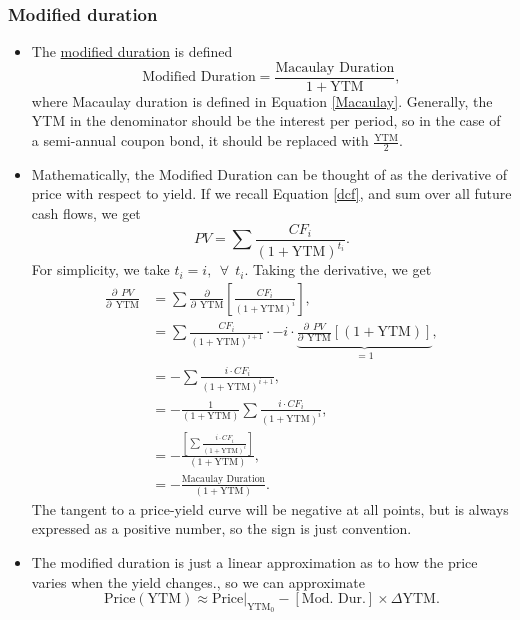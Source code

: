 \documentclass[../notes_compiled.tex]{subfiles}
\begin{document}
\subsubsection{Modified duration}
\begin{itemize}
\item The \underline{modified duration} is defined
\begin{equation}
\text{Modified Duration} = \frac{\text{Macaulay Duration}}{1 + \text{YTM}}, \label{mod-dur}
\end{equation}
where Macaulay duration is defined in Equation \ref{Macaulay}. Generally, the YTM in the denominator should be the interest per period, so in the case of a semi-annual coupon bond, it should be replaced with $\frac{\text{YTM}}{2}$.
\item Mathematically, the Modified Duration can be thought of as the derivative of price with respect to yield. If we recall Equation \ref{dcf}, and sum over all future cash flows, we get
\begin{equation}
PV = \sum\frac{CF_{i}}{(1+\text{YTM})^{t_{i}}}.
\end{equation}
For simplicity, we take $t_i = i, \phantom{,}\forall\phantom{,} t_{i}$. Taking the derivative, we get
\begin{align}
\frac{\partial \phantom{,}PV}{\partial \phantom{,}\text{YTM}} &= \sum\frac{\partial}{\partial \phantom{,}\text{YTM}}\left[\frac{CF_{i}}{(1+\text{YTM})^{i}}\right], \label{deriv-dur}\\
&= \sum\frac{CF_{i}}{(1+\text{YTM})^{i+1}}\cdot-i\cdot\underbrace{\frac{\partial \phantom{,}PV}{\partial \phantom{,}\text{YTM}}\left[(1+\text{YTM})\right]}_{=1}, \nonumber \\
&=- \sum\frac{i\cdot CF_{i}}{(1+\text{YTM})^{i+1}}, \nonumber \\
&=- \frac{1}{(1+\text{YTM})}\sum\frac{i\cdot CF_{i}}{(1+\text{YTM})^{i}}, \nonumber \\
&=- \frac{\left[\sum\frac{i\cdot CF_{i}}{(1+\text{YTM})^{i}}\right]}{(1+\text{YTM})}, \nonumber \\
&=-\frac{\text{Macaulay Duration}}{(1 + \text{YTM})}. \nonumber
\end{align}
The tangent to a price-yield curve will be negative at all points, but is always expressed as a positive number, so the sign is just convention.
\item The modified duration is just a linear approximation as to how the price varies when the yield changes., so we can approximate
\begin{equation}
\text{Price}(\text{YTM}) \approx \text{Price}|_{\text{YTM}_{0}} - [\text{Mod. Dur.}] \times \Delta \text{YTM}. \label{taylor-one}
\end{equation}


\end{itemize}
\end{document}
